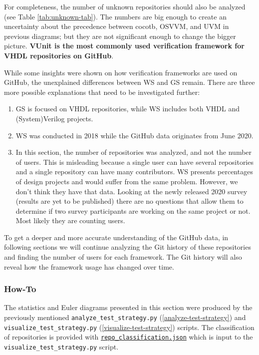 \documentclass[]{article}
\providecommand{\tightlist}{%
  \setlength{\itemsep}{0pt}\setlength{\parskip}{0pt}}
\begin{document}
For completeness, the number of unknown repositories should also be analyzed (see Table \ref{tab:unknown-tab}). The numbers are big enough to create an uncertainty about the precedence between cocotb, OSVVM, and UVM in previous diagrams; but they are not significant enough to change the bigger picture. \textbf{VUnit is the most commonly used verification framework for VHDL repositories on GitHub}.

While some insights were shown on how verification frameworks are used on GitHub, the unexplained differences between WS and GS remain. There are three more possible explanations that need to be investigated further:

\begin{enumerate}
\def\labelenumi{\arabic{enumi}.}
\tightlist
\item
  GS is focused on VHDL repositories, while WS includes both VHDL and (System)Verilog projects.
\item
  WS was conducted in 2018 while the GitHub data originates from June 2020.
\item
  In this section, the number of repositories was analyzed, and not the number of users. This is misleading because a single user can have several repositories and a single repository can have many contributors. WS presents percentages of design projects and would suffer from the same problem. However, we don't think they have that data. Looking at the newly released 2020 survey (results are yet to be published) there are no questions that allow them to determine if two survey participants are working on the same project or not. Most likely they are counting users.
\end{enumerate}

To get a deeper and more accurate understanding of the GitHub data, in following sections we will continue analyzing the Git history of these repositories and finding the number of users for each framework. The Git history will also reveal how the framework usage has changed over time.

\hypertarget{frameworks-howto}{%
\subsubsection{How-To}\label{frameworks-howto}}

The statistics and Euler diagrams presented in this section were produced by the previously mentioned \texttt{analyze\_test\_strategy.py} (\ref{analyze-test-strategy}) and \texttt{visualize\_test\_strategy.py} (\ref{visualize-test-strategy}) scripts. The classification of repositories is provided with \href{https://github.com/LarsAsplund/github-facts/tree/main/repo_classification.json}{\texttt{repo\_classification.json}} which is input to the \texttt{visualize\_test\_strategy.py} script.
\end{document}
